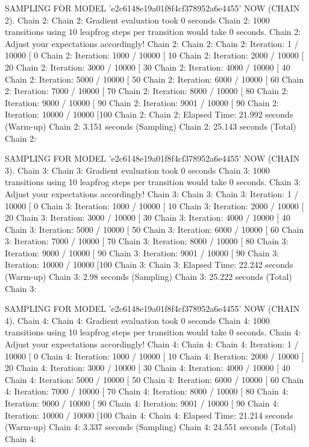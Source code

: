 \documentclass[
]{jss}
\begin{document}
\begin{CodeChunk}
\begin{CodeOutput}
SAMPLING FOR MODEL 'e2c6148e19a01f8f4cf378952a6e4455' NOW (CHAIN 2).
Chain 2: 
Chain 2: Gradient evaluation took 0 seconds
Chain 2: 1000 transitions using 10 leapfrog steps per transition would take 0 seconds.
Chain 2: Adjust your expectations accordingly!
Chain 2: 
Chain 2: 
Chain 2: Iteration:    1 / 10000 [  0%
Chain 2: Iteration: 1000 / 10000 [ 10%
Chain 2: Iteration: 2000 / 10000 [ 20%
Chain 2: Iteration: 3000 / 10000 [ 30%
Chain 2: Iteration: 4000 / 10000 [ 40%
Chain 2: Iteration: 5000 / 10000 [ 50%
Chain 2: Iteration: 6000 / 10000 [ 60%
Chain 2: Iteration: 7000 / 10000 [ 70%
Chain 2: Iteration: 8000 / 10000 [ 80%
Chain 2: Iteration: 9000 / 10000 [ 90%
Chain 2: Iteration: 9001 / 10000 [ 90%
Chain 2: Iteration: 10000 / 10000 [100%
Chain 2: 
Chain 2:  Elapsed Time: 21.992 seconds (Warm-up)
Chain 2:                3.151 seconds (Sampling)
Chain 2:                25.143 seconds (Total)
Chain 2: 

SAMPLING FOR MODEL 'e2c6148e19a01f8f4cf378952a6e4455' NOW (CHAIN 3).
Chain 3: 
Chain 3: Gradient evaluation took 0 seconds
Chain 3: 1000 transitions using 10 leapfrog steps per transition would take 0 seconds.
Chain 3: Adjust your expectations accordingly!
Chain 3: 
Chain 3: 
Chain 3: Iteration:    1 / 10000 [  0%
Chain 3: Iteration: 1000 / 10000 [ 10%
Chain 3: Iteration: 2000 / 10000 [ 20%
Chain 3: Iteration: 3000 / 10000 [ 30%
Chain 3: Iteration: 4000 / 10000 [ 40%
Chain 3: Iteration: 5000 / 10000 [ 50%
Chain 3: Iteration: 6000 / 10000 [ 60%
Chain 3: Iteration: 7000 / 10000 [ 70%
Chain 3: Iteration: 8000 / 10000 [ 80%
Chain 3: Iteration: 9000 / 10000 [ 90%
Chain 3: Iteration: 9001 / 10000 [ 90%
Chain 3: Iteration: 10000 / 10000 [100%
Chain 3: 
Chain 3:  Elapsed Time: 22.242 seconds (Warm-up)
Chain 3:                2.98 seconds (Sampling)
Chain 3:                25.222 seconds (Total)
Chain 3: 

SAMPLING FOR MODEL 'e2c6148e19a01f8f4cf378952a6e4455' NOW (CHAIN 4).
Chain 4: 
Chain 4: Gradient evaluation took 0 seconds
Chain 4: 1000 transitions using 10 leapfrog steps per transition would take 0 seconds.
Chain 4: Adjust your expectations accordingly!
Chain 4: 
Chain 4: 
Chain 4: Iteration:    1 / 10000 [  0%
Chain 4: Iteration: 1000 / 10000 [ 10%
Chain 4: Iteration: 2000 / 10000 [ 20%
Chain 4: Iteration: 3000 / 10000 [ 30%
Chain 4: Iteration: 4000 / 10000 [ 40%
Chain 4: Iteration: 5000 / 10000 [ 50%
Chain 4: Iteration: 6000 / 10000 [ 60%
Chain 4: Iteration: 7000 / 10000 [ 70%
Chain 4: Iteration: 8000 / 10000 [ 80%
Chain 4: Iteration: 9000 / 10000 [ 90%
Chain 4: Iteration: 9001 / 10000 [ 90%
Chain 4: Iteration: 10000 / 10000 [100%
Chain 4: 
Chain 4:  Elapsed Time: 21.214 seconds (Warm-up)
Chain 4:                3.337 seconds (Sampling)
Chain 4:                24.551 seconds (Total)
Chain 4: 


\end{CodeOutput}
\end{CodeChunk}
\end{document}
